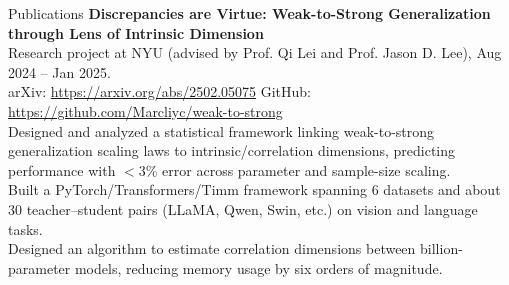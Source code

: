 \begin{rubric}{Publications}
\entry*[ICML 2025]%
	\textbf{Discrepancies are Virtue: Weak-to-Strong Generalization through Lens of Intrinsic Dimension}\\
	Research project at NYU (advised by Prof. Qi Lei and Prof. Jason D. Lee), Aug 2024 -- Jan 2025.\\
	arXiv: \url{https://arxiv.org/abs/2502.05075} \quad GitHub: \url{https://github.com/Marcliyc/weak-to-strong}\\
	Designed and analyzed a statistical framework linking weak-to-strong generalization scaling laws to intrinsic/correlation dimensions, predicting performance with $<3\%$ error across parameter and sample-size scaling.\\
	Built a PyTorch/Transformers/Timm framework spanning 6 datasets and about 30 teacher--student pairs (LLaMA, Qwen, Swin, etc.) on vision and language tasks.\\
	Designed an algorithm to estimate correlation dimensions between billion-parameter models, reducing memory usage by six orders of magnitude.
\end{rubric}
